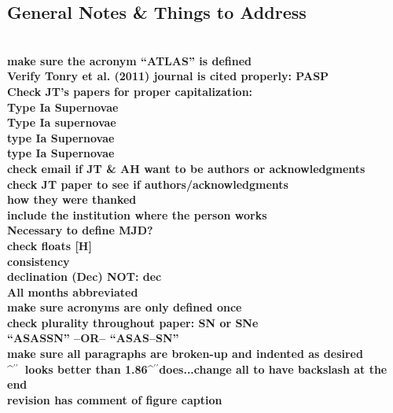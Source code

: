 \documentclass[aps,prb,twocolumn,superscriptaddress]{revtex4-1}
\def\arcsec{\ifmmode^{\prime\prime}\else$^{\prime\prime}$\fi}
\begin{document}
\clearpage
\begin{widetext} %
 \section{General Notes \& Things to Address}
 \\
 {\bf make sure the acronym ``ATLAS'' is defined\\}
 {\bf Verify Tonry et al. (2011) journal is cited properly: PASP\\}
 {\bf Check JT's papers for proper capitalization:\\
 \indent Type Ia Supernovae\\
 \indent Type Ia supernovae\\
 \indent type Ia Supernovae\\
 \indent type Ia Supernovae\\}
 {\bf check email if JT \& AH want to be authors or acknowledgments}\\
 {\bf check JT paper to see if authors/acknowledgments \\
 \indent how they were thanked\\
 \indent include the institution where the person works}\\
 {\bf Necessary to define MJD?}\\
 {\bf check floats [H]}\\
 {\bf \noindent consistency\\
 \indent declination (Dec) NOT: dec\\
 \indent All months abbreviated\\
 \indent make sure acronyms are only defined once\\
 \indent check plurality throughout paper: SN or SNe\\
 \indent ``ASASSN'' --OR-- ``ASAS--SN''\\
 \indent make sure all paragraphs are broken-up and indented as desired\\
 \arcsec\ looks better than 1.86\arcsec does...change all to have backslash at the end\\
 }
 {\bf revision has comment of figure caption\\}
\end{widetext}
\end{document}
